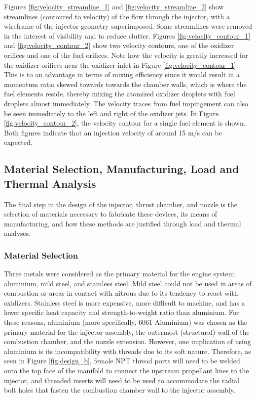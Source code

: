 \documentclass[9pt]{article} %
\numberwithin{equation}{section} %
\begin{document}
Figures \ref{fig:velocity_streamline_1} and \ref{fig:velocity_streamline_2} show streamlines (contoured to velocity) of the flow through the injector, with a wireframe of the injector geometry superimposed. Some streamlines were removed in the interest of visibility and to reduce clutter. Figures \ref{fig:velocity_contour_1} and \ref{fig:velocity_contour_2} show two velocity contours, one of the oxidizer orifices and one of the fuel orifices. Note how the velocity is greatly increased for the oxidizer orifices near the oxidizer inlet in Figure \ref{fig:velocity_contour_1}. This is to an advantage in terms of mixing efficiency since it would result in a momentum ratio skewed towards towards the chamber walls, which is where the fuel elements reside, thereby mixing the atomized oxidizer droplets with fuel droplets almost immediately. The velocity traces from fuel impingement can also be seen immediately to the left and right of the oxidizer jets. In Figure \ref{fig:velocity_contour_2}, the velocity contour for a single fuel element is shown. Both figures indicate that an injection velocity of around 15 m/s can be expected.

\subsection{Material Selection, Manufacturing, Load and Thermal Analysis}

\hspace{\parindent} The final step in the design of the injector, thrust chamber, and nozzle is the selection of materials necessary to fabricate these devices, its means of manufacturing, and how these methods are justified through load and thermal analyses.

\subsubsection{Material Selection}

\hspace{\parindent} Three metals were considered as the primary material for the engine system: aluminium, mild steel, and stainless steel. Mild steel could not be used in areas of combustion or areas in contact with nitrous due to its tendency to react with oxidizers. Stainless steel is more expensive, more difficult to machine, and has a lower specific heat capacity and strength-to-weight ratio than aluminium. For these reasons, aluminium (more specifically, 6061 Aluminium) was chosen as the primary material for the injector assembly, the outermost (structural) wall of the combustion chamber, and the nozzle extension. However, one implication of using aluminium is its incompatibility with threads due to its soft nature. Therefore, as seen in Figure \ref{fig:design_b}, female NPT thread ports will need to be welded onto the top face of the manifold to connect the upstream propellant lines to the injector, and threaded inserts will need to be used to accommodate the radial bolt holes that fasten the combustion chamber wall to the injector assembly.
\end{document}
